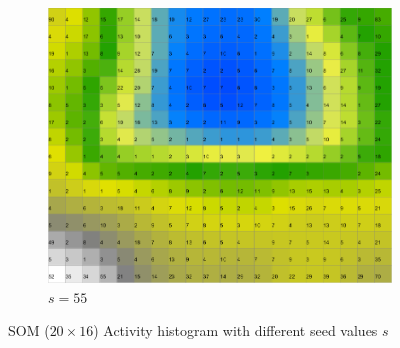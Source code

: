 \documentclass{acm_proc_article-sp}
\begin{document}
\begin{figure}
\begin{subfigure}[b]{0.30\linewidth}
    \end{subfigure}
    \begin{subfigure}[b]{0.30\linewidth}
        \includegraphics[width=\linewidth]{img/wine-newmid-activity-histogram-seed-55}
        \caption{$s=55$}
        \label{fig:wine-newmid-activity-histogram-seed-55}
    \end{subfigure}
    \caption{SOM ($20\times16$) Activity histogram with different seed values $s$}
    \label{fig:wine-newmid-activity-histogram-seed}
\end{figure}
\end{document}
